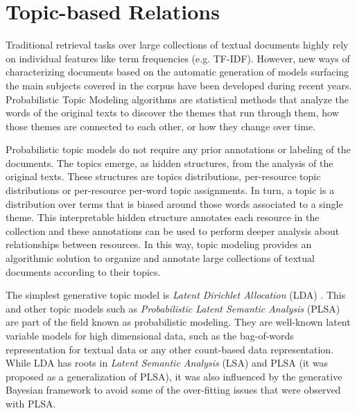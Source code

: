 \section{Topic-based Relations}

Traditional retrieval tasks over large collections of textual documents \cite{Hearst1999} highly rely on individual features like term frequencies (e.g. TF-IDF). However, new ways of characterizing documents based on the automatic generation of models surfacing the main subjects covered in the corpus have been developed during recent years. Probabilistic Topic Modeling \cite{Blei2010} algorithms are statistical methods that analyze the words of the original texts to discover the themes that run through them, how those themes are connected to each other, or how they change over time.

Probabilistic topic models do not require any prior annotations or labeling of the documents. The topics emerge, as hidden structures, from the analysis of the original texts. These structures are topics distributions, per-resource topic distributions or per-resource per-word topic assignments. In turn, a topic is a distribution over terms that is biased around those words associated to a single theme. This interpretable hidden structure annotates each resource in the collection and these annotations can be used to perform deeper analysis about relationships between resources. In this way, topic modeling provides an algorithmic solution to organize and annotate large collections of textual documents according to their topics.

The simplest generative topic model is \textit{Latent Dirichlet Allocation} (LDA) \cite{Blei2003}. This and other topic models such as \textit{Probabilistic Latent Semantic Analysis} (PLSA) \cite{Hofmann2001} are part of the field known as probabilistic modeling. They are well-known latent variable models for high dimensional data, such as the bag-of-words representation for textual data or any other count-based data representation. While LDA has roots in \textit{Latent Semantic Analysis} (LSA) \cite{Deerwester1990} and PLSA (it was proposed as a generalization of PLSA), it was also influenced by the generative Bayesian framework to avoid some of the over-fitting issues that were observed with PLSA.

